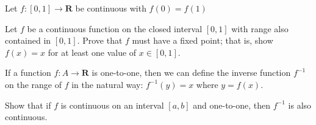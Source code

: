 \begin{exercise}
  Let $f:[0,1] \rightarrow \mathbf{R}$ be continuous with $f(0)=f(1)$
\end{exercise}
\begin{solution}
  \TODO
\end{solution}

\begin{exercise}
  Let $f$ be a continuous function on the closed interval $[0,1]$ with range also contained in $[0,1]$. Prove that $f$ must have a fixed point; that is, show $f(x)=x$ for at least one value of $x \in[0,1]$.
\end{exercise}
\begin{solution}
  \TODO
\end{solution}

\begin{exercise}
  If a function $f: A \rightarrow \mathbf{R}$ is one-to-one, then we can define the inverse function $f^{-1}$ on the range of $f$ in the natural way: $f^{-1}(y)=x$ where $y=f(x)$.

  Show that if $f$ is continuous on an interval $[a, b]$ and one-to-one, then $f^{-1}$ is also continuous.
\end{exercise}
\begin{solution}
  \TODO
\end{solution}
